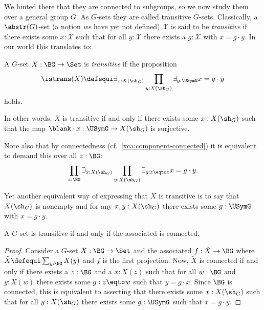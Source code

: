 We hinted there that they are connected to subgroups, so
we now study them over a general group $G$.
As $G$-sets they are called transitive $G$-sets.
Classically, a $\abstr(G)$-set (a notion \emph{we} have yet not defined) $\mathcal X$ is said to be \emph{transitive} if there exists some $x:\mathcal X$ such that for all $y:\mathcal X$ there exists a $g:\mathcal X$ with $x=g\cdot y$.  In our world this translates to:
\begin{definition}\label{def:transitiveGset}
  A $G$-set $X:\BG\to\Set$ is \emph{transitive} if the proposition
  \[
    \istrans(X) \defequi
    \exists_{x:X(\sh_G)} \prod_{y:X(\sh_G)} \exists_{g:\USymG} x=g\cdot y
  \]
  holds.
\end{definition}
\begin{remark}
  In other words, $X$ is transitive if and only if there exists
  some $x:X(\sh_G)$ such that the map $\blank\cdot x:\USymG\to X(\sh_G)$ is
  surjective.

  Note also that by connectedness (cf.~\cref{xca:component-connected})
  it is equivalent to demand this over all $z:\BG$:
  \begin{equation}\label{eq:Gset-trans-gen}
    \prod_{z:\BG}\exists_{x:X(\sh_G)}
    \prod_{y:X(\sh_G)}\exists_{g:z\eqto z}x=g\cdot y.
  \end{equation}

  Yet another equivalent way of expressing that $X$ is transitive is to say
  that $X(\sh_G)$ is nonempty and for any $x,y:X(\sh_G)$ there
  exists some $g:\USymG$ with $x = g\cdot y$.
\end{remark}

\begin{lemma}
  \label{lem:conistrans}
  A $G$-set is transitive if and only if the associated \covering is connected.
\end{lemma}
\begin{proof}
  Consider a $G$-set $X:\BG\to\Set$ and the associated \covering
  $f:\tilde X\to\BG$ where $\tilde X\defequi\sum_{y:\BG}X(y)$ and $f$
  is the first projection.  Now, $\tilde X$ is connected if and only
  if there exists a $z:\BG$ and a $x:X(z)$ such that for
  all $w:\BG$ and $y:X(w)$ there exists some $g:z\eqto w$ such that $y=g\cdot x$.
  Since $\BG$ is connected, this is equivalent to asserting that there
  exists some $x:X(\sh_G)$ such that for all $y:X(\sh_G)$ there exists
  some $g:\USymG$ such that $x=g\cdot y$.
\end{proof}

